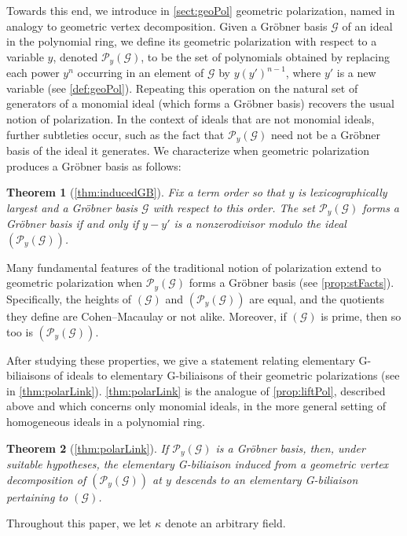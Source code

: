 \documentclass[12pt, reqno]{amsart}
\numberwithin{equation}{section}
\newtheorem{Main Conjecture}[theorem]{Main Conjecture}
\theoremstyle{definition}
\theoremstyle{plain}
\newtheorem{introthm}{Theorem}
\newcommand{\G}{\mathcal{G}}
\renewcommand{\P}{\mathcal{P}}
\begin{document}
 Towards this end, we introduce in \cref{sect:geoPol} geometric polarization, named in analogy to geometric vertex decomposition. Given a Gr\"obner basis $\G$ of an ideal in the polynomial ring, we define its geometric polarization with respect to a variable $y$, denoted $\P_y(\G)$, to be the set of polynomials obtained by replacing each power $y^n$ occurring in an element of $\G$ by $y(y')^{n-1}$, where $y'$ is a new variable (see \cref{def:geoPol}). Repeating this operation on the natural set of generators of a monomial ideal (which forms a Gr\"obner basis) recovers the usual notion of polarization. In the context of ideals that are not monomial ideals, further subtleties occur, such as the fact that $\P_y(\G)$ need not be a Gr\"obner basis of the ideal it generates. We characterize when geometric polarization produces a Gr\"obner basis as follows:
 \begin{introthm}[{\cref{thm:inducedGB}}]
      Fix a term order so that $y$ is lexicographically largest and a Gr\"obner basis $\G$ with respect to this order. The set $\P_y(\G)$ forms a Gr\"obner basis if and only if $y-y'$ is a nonzerodivisor modulo the ideal $(\P_y(\G))$.
 \end{introthm}
 
 Many fundamental features of the traditional notion of polarization extend to geometric polarization when $\P_y(\G)$ forms a Gr\"obner basis (see \cref{prop:stFacts}). Specifically, the heights of $(\G)$ and $(\P_y(\G))$ are equal, and the quotients they define are Cohen--Macaulay or not alike.  Moreover, if $(\G)$ is prime, then so too is $(\P_y(\G))$.
 
 After studying these properties, we give a statement relating elementary G-biliaisons of ideals to elementary G-biliaisons of their geometric polarizations (see in \cref{thm:polarLink}).  \cref{thm:polarLink} is the analogue of \cref{prop:liftPol}, described above and which concerns only monomial ideals, in the more general setting of homogeneous ideals in a polynomial ring.

\begin{introthm}[\cref{thm:polarLink}]
   If $\P_y(\G)$ is a Gr\"obner basis, then, under suitable hypotheses, the elementary G-biliaison induced from a geometric vertex decomposition of $(\P_y(\G))$ at $y$ descends to an elementary G-biliaison pertaining to $(\G)$.
\end{introthm}

Throughout this paper, we let $\kappa$ denote an arbitrary field.
\end{document}

